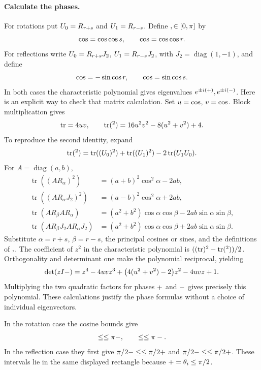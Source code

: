 \documentclass[11pt]{article}
\numberwithin{equation}{section}
\newcommand{\W}{\sym{Wcompetitor}}
\newcommand{\hmean}{\sym{PairMeanAngle}}
\newcommand{\dhalf}{\sym{PairHalfDifference}}
\newcommand{\phaseX}{\sym{PairPhaseX}}
\newcommand{\phaseY}{\sym{PairPhaseY}}
\newcommand{\Cpair}{\sym{PairCosineBlock}}
\newcommand{\Spair}{\sym{PairSineBlock}}
\newcommand{\Ufree}[1]{\like{PairFreeOrthogonal}{U_{#1}}}
\begin{document}
\paragraph{Calculate the phases.}
For rotations put $\Ufree{0}=R_{r+s}$ and $\Ufree{1}=R_{r-s}$.
Define $\phaseX,\phaseY\in[0,\pi]$ by
\[
 \cos\phaseX=\cos\hmean\cos s,
 \qquad \cos\phaseY=\cos\dhalf\cos r.
\]
For reflections write $\Ufree{0}=R_{r+s}J_2$,
$\Ufree{1}=R_{r-s}J_2$, with $J_2=\operatorname{diag}(1,-1)$, and define
\[
 \cos\phaseX=-\sin\dhalf\cos r,
 \qquad \cos\phaseY=\sin\hmean\cos s.
\]
In both cases the characteristic polynomial gives eigenvalues
$e^{\pm i(\phaseX+\phaseY)},e^{\pm i(\phaseX-\phaseY)}$.
Here is an explicit way to check that matrix calculation. Set
$u=\cos\phaseX$, $v=\cos\phaseY$. Block multiplication gives
\[
 \operatorname{tr}\W=4uv,\qquad
 \operatorname{tr}(\W^2)=16u^2v^2-8(u^2+v^2)+4.
\]
To reproduce the second identity, expand
\[
 \operatorname{tr}(\W^2)=
 \operatorname{tr}((\Cpair\Ufree{0})^2)
 +\operatorname{tr}((\Cpair\Ufree{1})^2)
 -2\operatorname{tr}(\Spair\Ufree{1}\Spair\Ufree{0}).
\]
For $A=\operatorname{diag}(a,b)$,
\begin{align*}
 \operatorname{tr}((AR_\alpha)^2)&=(a+b)^2\cos^2\alpha-2ab,\\
 \operatorname{tr}((AR_\alpha J_2)^2)&=(a-b)^2\cos^2\alpha+2ab,\\
 \operatorname{tr}(AR_\beta AR_\alpha)
   &=(a^2+b^2)\cos\alpha\cos\beta-2ab\sin\alpha\sin\beta,\\
 \operatorname{tr}(AR_\beta J_2 AR_\alpha J_2)
   &=(a^2+b^2)\cos\alpha\cos\beta+2ab\sin\alpha\sin\beta.
\end{align*}
Substitute $\alpha=r+s$, $\beta=r-s$, the principal cosines or sines,
and the definitions of $\hmean,\dhalf$. The coefficient of $z^2$ in the
characteristic polynomial is
$((\operatorname{tr}\W)^2-\operatorname{tr}(\W^2))/2$.
Orthogonality and determinant one make the polynomial reciprocal, yielding
\[
 \det(zI-\W)=z^4-4uvz^3+
       \bigl(4(u^2+v^2)-2\bigr)z^2-4uvz+1.
\]
Multiplying the two quadratic factors for phases
$\phaseX+\phaseY$ and $\phaseX-\phaseY$ gives precisely this polynomial.
These calculations justify the phase formulas without a choice of
individual eigenvectors.

In the rotation case the cosine bounds give
\[
 \hmean\le\phaseX\le\pi-\hmean,
 \qquad \dhalf\le\phaseY\le\pi-\dhalf.
\]
In the reflection case they first give
$\pi/2-\dhalf\le\phaseX\le\pi/2+\dhalf$ and
$\pi/2-\hmean\le\phaseY\le\pi/2+\hmean$.
These intervals lie in the same displayed rectangle because
$\hmean+\dhalf=\theta_i\le\pi/2$.
\end{document}
